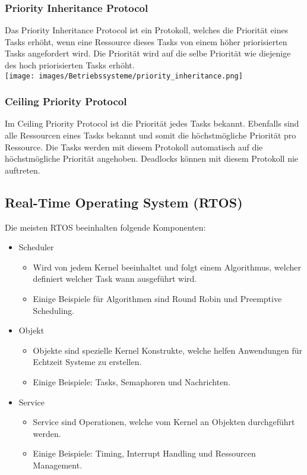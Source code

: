 \subsubsection{Priority Inheritance Protocol}
Das Priority Inheritance Protocol ist ein Protokoll, welches die Priorität eines Tasks erhöht, wenn eine Ressource dieses Tasks von einem höher priorisierten Tasks angefordert wird. Die Priorität wird auf die selbe Priorität wie diejenige des hoch priorisierten Tasks erhöht. \\
\texttt{[image: images/Betriebssysteme/priority\_inheritance.png]}

\subsubsection{Ceiling Priority Protocol}
Im Ceiling Priority Protocol ist die Priorität jedes Tasks bekannt. Ebenfalls sind alle Ressourcen eines Tasks bekannt und somit die höchstmögliche Priorität pro Ressource. Die Tasks werden mit diesem Protokoll automatisch auf die höchstmögliche Priorität angehoben. Deadlocks können mit diesem Protokoll nie auftreten.

\subsection{Real-Time Operating System (RTOS)}
Die meisten RTOS beeinhalten folgende Komponenten:
\begin{itemize}
    \item Scheduler
    \begin{itemize}
        \item Wird von jedem Kernel beeinhaltet und folgt einem Algorithmus, welcher definiert welcher Task wann ausgeführt wird.
        \item Einige Beispiele für Algorithmen sind Round Robin und Preemptive Scheduling.
    \end{itemize}
    \item Objekt
    \begin{itemize}
        \item Objekte sind spezielle Kernel Konstrukte, welche helfen Anwendungen für Echtzeit Systeme zu erstellen.
        \item Einige Beispiele: Tasks, Semaphoren und Nachrichten.
    \end{itemize}
    \item Service
    \begin{itemize}
        \item Service sind Operationen, welche vom Kernel an Objekten durchgeführt werden.
        \item Einige Beispiele: Timing, Interrupt Handling und Ressourcen Management.
    \end{itemize}
\end{itemize}

